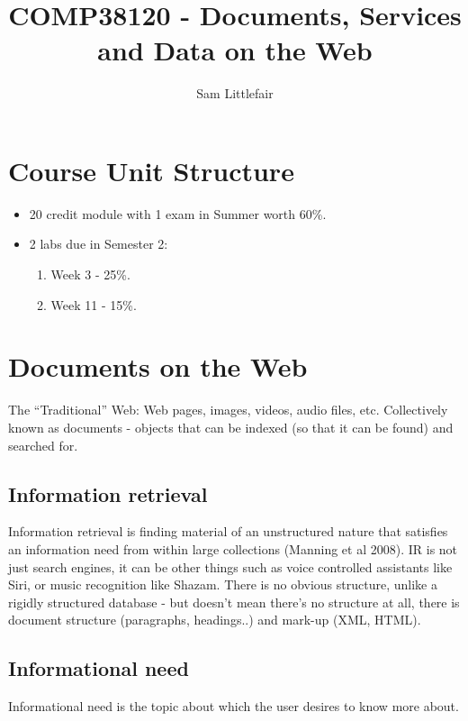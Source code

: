\documentclass[11pt]{article}
\title{COMP38120 - Documents, Services and Data on the Web}
\author{Sam Littlefair}
\begin{document}
\maketitle


\section{Course Unit Structure}
\begin{itemize}
  \item 20 credit module with 1 exam in Summer worth 60\%.
  \item 2 labs due in Semester 2:
  \begin{enumerate}
     \item Week 3 - 25\%.
     \item Week 11 - 15\%.
    \end{enumerate}
\end{itemize}


\section{Documents on the Web}
The “Traditional” Web: Web	pages,	images,	videos,	audio	files,	etc.
Collectively	known	as	documents - objects	that	can
be	indexed	(so	that	it	can	be	found) and searched for.

\subsection{Information retrieval}
Information retrieval is finding material of an unstructured nature that
satisfies an information need from within large collections (Manning et al 2008).
IR is not just search engines, it can be other things such as voice controlled assistants like Siri, or music recognition like Shazam.
There is no obvious structure, unlike a rigidly structured database - but doesn't mean there's no structure at all, there is document structure (paragraphs, headings..) and mark-up (XML, HTML).

\subsection{Informational need} %
Informational need is the topic about which the user desires to know more about.
\end{document}
